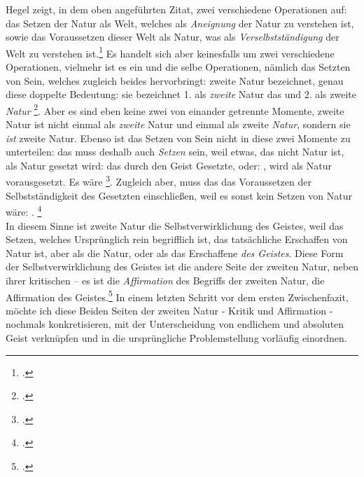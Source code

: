 \documentclass[12pt, a4paper, openany]{report}
\begin{document}
Hegel zeigt, in dem oben angeführten Zitat, zwei verschiedene Operationen auf: 
das Setzen der Natur als Welt, welches als \emph{Aneignung} der Natur zu verstehen ist, sowie das Voraussetzen dieser Welt als Natur, was als \emph{Verselbstständigung} der Welt zu verstehen ist.\footcite[Vgl][141]{menke_autonomie_2018}
Es handelt sich aber keinesfalls um zwei verschiedene Operationen, vielmehr ist es ein und die selbe Operationen, nämlich das Setzten von Sein, welches zugleich beides hervorbringt: 
zweite Natur bezeichnet, genau diese doppelte Bedeutung: 
sie bezeichnet 1. als \emph{zweite} Natur das  und 2. als zweite \emph{Natur} \footcite[][142]{menke_autonomie_2018}.
Aber es sind eben keine zwei von einander getrennte Momente, zweite Natur ist nicht einmal als \emph{zweite} Natur und einmal als zweite \emph{Natur}, sondern sie \emph{ist} zweite Natur.
Ebenso ist das Setzen von Sein nicht in diese zwei Momente zu unterteilen:
das  muss deshalb auch \emph{Setzen} sein, weil etwas, das nicht Natur ist, als Natur gesetzt wird:
das durch den Geist Gesetzte, oder: , wird als Natur vorausgesetzt.
Es wäre \footcite[][142]{menke_autonomie_2018}.
Zugleich aber, muss das  das Voraussetzen der Selbstständigkeit des Gesetzten einschließen, weil es sonst kein Setzen von Natur wäre: 
.%
\footcite[][142. 
    Der Begriff der zweiten Natur als Kritik aufgefasst, entlarvt genau dieses Verhältnis: er zeigt auf, dass das als Nichtgesetztes Gesetzte, Gesetztes ist.
    Als Affirmativ aufgefasst, zeigt er die Macht des Geistes, Gesetztes als Nichtgesetztes zu setzen.
]{menke_autonomie_2018}\\
In diesem Sinne ist zweite Natur die Selbstverwirklichung des Geistes, weil das Setzen, welches Ursprünglich rein begrifflich ist, das tatsächliche Erschaffen von Natur ist, aber als die Natur, oder als das Erschaffene \emph{des Geistes}.
Diese Form der Selbstverwirklichung des Geistes ist die andere Seite der zweiten Natur, neben ihrer kritischen -- es ist die \emph{Affirmation} des Begriffs der zweiten Natur, die Affirmation des Geistes.\footcite[Vgl.][143]{menke_autonomie_2018}
In einem letzten Schritt vor dem ersten Zwischenfazit, möchte ich diese Beiden Seiten der zweiten Natur - Kritik und Affirmation - nochmals konkretisieren, mit der Unterscheidung von endlichem und absoluten Geist verknüpfen und in die ursprüngliche Problemstellung vorläufig einordnen.
\end{document}
